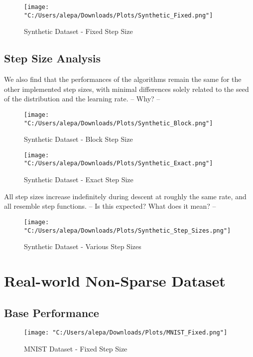 \documentclass{article}
\begin{document}
\begin{figure}[H]
    \centering
    \texttt{[image: "C:/Users/alepa/Downloads/Plots/Synthetic\_Fixed.png"]}
    \caption{Synthetic Dataset - Fixed Step Size}
    \label{fig:synthetic_fixed}
\end{figure}

\subsection{Step Size Analysis}
We also find that the performances of the algorithms remain the same for the other implemented step sizes, with minimal differences solely related to the seed of the distribution and the learning rate. -- Why? --

\begin{figure}[H]
    \centering
    \texttt{[image: "C:/Users/alepa/Downloads/Plots/Synthetic\_Block.png"]}
    \caption{Synthetic Dataset - Block Step Size}
    \label{fig:synthetic_block}
\end{figure}

\begin{figure}[H]
    \centering
    \texttt{[image: "C:/Users/alepa/Downloads/Plots/Synthetic\_Exact.png"]}
    \caption{Synthetic Dataset - Exact Step Size}
    \label{fig:synthetic_exact}
\end{figure}

All step sizes increase indefinitely during descent at roughly the same rate, and all resemble step functions. -- Is this expected? What does it mean? --
\begin{figure}[H]
    \centering
    \texttt{[image: "C:/Users/alepa/Downloads/Plots/Synthetic\_Step\_Sizes.png"]}
    \caption{Synthetic Dataset - Various Step Sizes}
    \label{fig:synthetic_step_sizes}
\end{figure}


\section{Real-world Non-Sparse Dataset}

\subsection{Base Performance}
\begin{figure}[H]
    \centering
    \texttt{[image: "C:/Users/alepa/Downloads/Plots/MNIST\_Fixed.png"]}
    \caption{MNIST Dataset - Fixed Step Size}
    \label{fig:mnist_fixed}
\end{figure}
\end{document}

